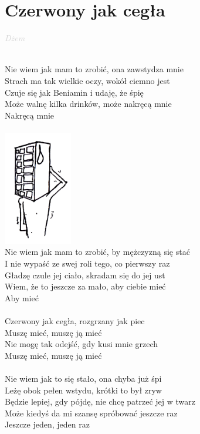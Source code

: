 \documentclass[a5paper, 10pt]{book}
\begin{document}
\section{Czerwony jak cegła}\textcolor{lightgray}{\textit{Dżem}}\\~\\
\begin{minipage}[t]{0.8\textwidth}
Nie wiem jak mam to zrobić, ona zawstydza mnie\\
Strach ma tak wielkie oczy, wokół ciemno jest\\
Czuje się jak Beniamin i udaję, że śpię\\
Może walnę kilka drinków, może nakręcą mnie\\
Nakręcą mnie\\
\\
\includegraphics[height=5cm,right]{images/czerwony_jak_cegla.png}\vspace*{-51mm}\\
Nie wiem jak mam to zrobić, by mężczyzną się stać\\
I nie wypaść ze swej roli tego, co pierwszy raz\\
Gładzę czule jej ciało, skradam się do jej ust\\
Wiem, że to jeszcze za mało, aby ciebie mieć\\
Aby mieć\\
\\
\hspace*{5mm}Czerwony jak cegła, rozgrzany jak piec\\
\hspace*{5mm}Muszę mieć, muszę ją mieć\\
\hspace*{5mm}Nie mogę tak odejść, gdy kusi mnie grzech\\
\hspace*{5mm}Muszę mieć, muszę ją mieć\\
\\
Nie wiem jak to się stało, ona chyba już śpi\\
Leżę obok pełen wstydu, krótki to był zryw\\
Będzie lepiej, gdy pójdę, nie chcę patrzeć jej w twarz\\
Może kiedyś da mi szansę spróbować jeszcze raz\\
Jeszcze jeden, jeden raz\\
\end{minipage}
\end{document}
